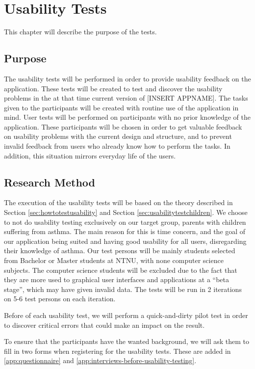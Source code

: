 \chapter{Usability Tests}
\label{chp:usabilitytests}

This chapter will describe the purpose of the tests.


\section{Purpose}
\label{sec:usabilitypurpose}
The usability tests will be performed in order to provide usability feedback on the application. These tests will be created to test and discover the usability problems in the at that time current version of [INSERT APPNAME]. The tasks given to the participants will be created with routine use of the application in mind. User tests will be performed on participants with no prior knowledge of the application. These participants will be chosen in order to get valuable feedback on usability problems with the current design and structure, and to prevent invalid feedback from users who already know how to perform the tasks. In addition, this situation mirrors everyday life of the users.


\section{Research Method}
The execution of the usability tests will be based on the theory described in Section \ref{sec:howtotestusability} and Section \ref{sec:usabilitytestchildren}. We choose to not do usability testing exclusively on our target group, parents with children suffering from asthma. The main reason for this is time concern, and the goal of our application being suited and having good usability for all users, disregarding their knowledge of asthma. Our test persons will be mainly students selected from Bachelor or Master students at NTNU, with none computer science subjects. The computer science students will be excluded due to the fact that they are more used to graphical user interfaces and applications at a ``beta stage'', which may have given invalid data. The tests will be run in 2 iterations on 5-6 test persons on each iteration. 

Before of each usability test, we will perform a quick-and-dirty pilot test in order to discover critical errors that could make an impact on the result.

To ensure that the participants have the wanted background, we will ask them to fill in two forms when registering for the usability tests. These are added in \ref{app:questionnaire} and \ref{app:interviews-before-usability-testing}.


